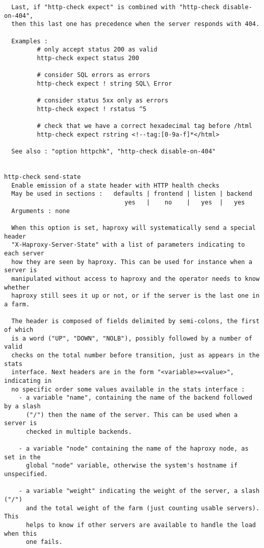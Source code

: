\begin{verbatim}
  Last, if "http-check expect" is combined with "http-check disable-on-404",
  then this last one has precedence when the server responds with 404.

  Examples :
         # only accept status 200 as valid
         http-check expect status 200

         # consider SQL errors as errors
         http-check expect ! string SQL\ Error

         # consider status 5xx only as errors
         http-check expect ! rstatus ^5

         # check that we have a correct hexadecimal tag before /html
         http-check expect rstring <!--tag:[0-9a-f]*</html>

  See also : "option httpchk", "http-check disable-on-404"


http-check send-state
  Enable emission of a state header with HTTP health checks
  May be used in sections :   defaults | frontend | listen | backend
                                 yes   |    no    |   yes  |   yes
  Arguments : none

  When this option is set, haproxy will systematically send a special header
  "X-Haproxy-Server-State" with a list of parameters indicating to each server
  how they are seen by haproxy. This can be used for instance when a server is
  manipulated without access to haproxy and the operator needs to know whether
  haproxy still sees it up or not, or if the server is the last one in a farm.

  The header is composed of fields delimited by semi-colons, the first of which
  is a word ("UP", "DOWN", "NOLB"), possibly followed by a number of valid
  checks on the total number before transition, just as appears in the stats
  interface. Next headers are in the form "<variable>=<value>", indicating in
  no specific order some values available in the stats interface :
    - a variable "name", containing the name of the backend followed by a slash
      ("/") then the name of the server. This can be used when a server is
      checked in multiple backends.

    - a variable "node" containing the name of the haproxy node, as set in the
      global "node" variable, otherwise the system's hostname if unspecified.

    - a variable "weight" indicating the weight of the server, a slash ("/")
      and the total weight of the farm (just counting usable servers). This
      helps to know if other servers are available to handle the load when this
      one fails.


\end{verbatim}
